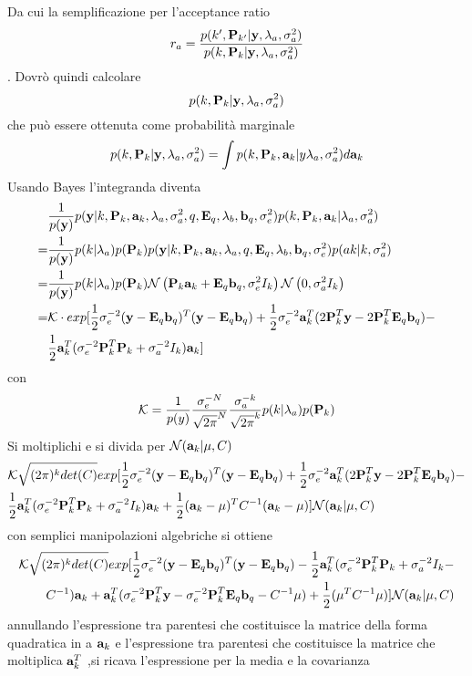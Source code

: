 Da cui la semplificazione per l'acceptance ratio
\begin{equation}
r_a=\frac{p(k',\pknew|\y,\la,\va)}{p(k,\pk|\y,\la,\va)}
\end{equation}.
Dovrò quindi calcolare
\begin{equation}
p(k,\pk|\y,\la,\va)
\end{equation}
che può essere ottenuta come probabilità marginale
\begin{equation}
p(k,\pk|\y,\la,\va)=\int p(k,\pk,\ak|y\la,\va)d\ak
\end{equation}
Usando Bayes l'integranda diventa
\begin{align*}
& \frac{1}{p(\y)}p(\y|k,\pk,\ak,\la,\va,q,\eq,\lb,\bq,\ve)p(k,\pk,\ak|\la,\va)\\
=&\frac{1}{p(\y)}p(k|\la)p(\pk)p(\y|k,\pk,\ak,\la,q,\eq,\lb,\bq,\ve)p(ak|k,\va)\\
=&\frac{1}{p(\y)}p(k|\la)p(\pk)\normal{\pk\ak+\eq\bq}{\ve I_k}\normal{0}{\va I_k}\\
=& \mathcal{K}\cdot exp[ \mez \sigma_e^{-2}(\y-\eq\bq)^{T}(\y-\eq\bq)+\mez \sigma_e^{-2}\ak^{T}(2\pk^{T}\y-2\pk^T\eq\bq)-\\
&\mez\ak^T(\sigma_e^{-2}\pk^T\pk+\sigma_a^{-2}I_k)\ak ]
\end{align*}
con
\begin{equation}
\mathcal{K}=\frac{1}{p(y)}\frac{\sigma_e^{-N}}{\sqrt{2\pi}^N}\frac{\sigma_a^{-k}}{\sqrt{2\pi}^k}p(k|\la)p(\pk)
\end{equation}
Si moltiplichi e si divida per $\mathcal{N}({\ak |\mu,C})$
\begin{align*}
&\mathcal{K}\sqrt{(2\pi)^k det(C)} exp[ \mez \sigma_e^{-2}(\y-\eq\bq)^{T}(\y-\eq\bq)+\mez \sigma_e^{-2}\ak^{T}(2\pk^{T}\y-2\pk^T\eq\bq)-\\
&\mez\ak^T(\sigma_e^{-2}\pk^T\pk+\sigma_a^{-2}I_k)\ak+\mez(\ak-\mu)^TC^{-1}(\ak-\mu) ]\mathcal{N}(\ak|\mu,C)
\end{align*}
con semplici manipolazioni algebriche si ottiene
\begin{align*}
\mathcal{K}\sqrt{(2\pi)^k det(C)}
exp[\mez\sigma_e^{-2}(\y-\eq\bq)^{T}(\y-\eq\bq)-\mez\ak^T(\sigma_e^{-2}\pk^T\pk+\sigma_a^{-2} I_k-\\C^{-1})\ak+\ak^T(\sigma_e^{-2}\pk^T\y-\sigma_e^{-2}\pk^T\eq\bq-C^{-1}\mu)+\mez(\mu^TC^{-1}\mu)]\mathcal{N}(\ak |\mu, C)
\end{align*}
annullando l’espressione tra parentesi che costituisce la matrice della forma quadratica in a $\ak$ e l’espressione tra parentesi che costituisce la matrice che moltiplica  $\ak^T$ ,si ricava l’espressione per la media e la covarianza
